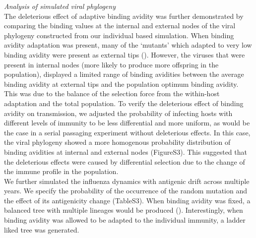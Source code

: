 \documentclass[12pt,a4paper]{article}
\begin{document}
{\it  Analysis of simulated viral phylogeny} \\
The deleterious effect of adaptive binding avidity was further demonstrated by comparing the binding values at the internal and external nodes of the viral phylogeny constructed from our individual based simulation. When binding avidity adaptation was present, many of  the ‘mutants’ which adapted to very low binding avidity were present as external tips (). However, the viruses that were present in internal nodes (more likely to produce more offspring in the population), displayed a limited range of binding avidities between the average binding avidity at external tips and the population optimum binding avidity. This was due to the balance of the selection force from the within-host adaptation and the total population. To verify the deleterious effect of binding avidity on transmission, we adjusted the probability of infecting hosts with different levels of immunity to be less differential and more uniform, as would be the case in a serial passaging experiment without deleterious effects. In this case, the viral phylogeny showed a more homogenous probability distribution of binding avidities at internal and external nodes (FigureS3). This suggested that the deleterious effects were caused by differential selection due to the change of the immune profile in the population. \\

We further simulated the influenza dynamics with antigenic drift across multiple years. We specify the probability of the occurrence of the random mutation and the effect of its antigenicity change (TableS3). When binding avidity was fixed, a balanced tree with multiple lineages would be produced (). Interestingly, when binding avidity was allowed to be adapted to the individual immunity, a ladder liked tree was generated.     
\end{document}
